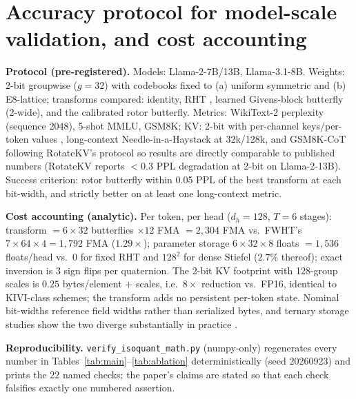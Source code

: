 \documentclass{article}
\begin{document}
\section{Accuracy protocol for model-scale validation, and cost accounting}
\label{app:acc}

\textbf{Protocol (pre-registered).} Models: Llama-2-7B/13B, Llama-3.1-8B.
Weights: 2-bit groupwise ($g=32$) with codebooks fixed to (a) uniform
symmetric and (b) E8-lattice; transforms compared: identity, RHT
\citep{tseng2024quipsharp}, learned Givens-block butterfly (2-wide), and the
calibrated rotor butterfly. Metrics: WikiText-2 perplexity (sequence 2048),
5-shot MMLU, GSM8K; KV: 2-bit with per-channel keys/per-token values
\citep{liu2024kivi}, long-context Needle-in-a-Haystack at 32k/128k, and
GSM8K-CoT following RotateKV's protocol \citep{su2025rotatekv} so results are
directly comparable to published numbers (RotateKV reports $<0.3$ PPL
degradation at 2-bit on Llama-2-13B).
Success criterion: rotor butterfly within 0.05 PPL of the best
transform at each bit-width, and strictly better on at least one long-context
metric.

\textbf{Cost accounting (analytic).} Per token, per head
($d_h=128$, $T=6$ stages): transform $=6\times32$ butterflies $\times12$ FMA
$=2{,}304$ FMA vs.\ FWHT's $7\times64\times4=1{,}792$ FMA ($1.29\times$);
parameter storage $6\times32\times8$ floats $=1{,}536$ floats/head vs.\ 0 for
fixed RHT and $128^2$ for dense Stiefel ($2.7\%$ thereof); exact inversion is
3 sign flips per quaternion. The 2-bit KV footprint with 128-group scales is
$0.25$ bytes/element $+$ scales, i.e.\ $8\times$ reduction vs.\ FP16,
identical to KIVI-class schemes; the transform adds no persistent per-token
state. Nominal bit-widths reference field widths rather than serialized bytes,
and ternary storage studies show the two diverge substantially in practice
\citep{georganas2026bitcos}.

\textbf{Reproducibility.} \texttt{verify\_isoquant\_math.py} (numpy-only)
regenerates every number in
Tables~\ref{tab:main}--\ref{tab:ablation} deterministically (seed 20260923)
and prints the 22 named checks; the paper's claims are stated so that each
check falsifies exactly one numbered assertion.
\end{document}
